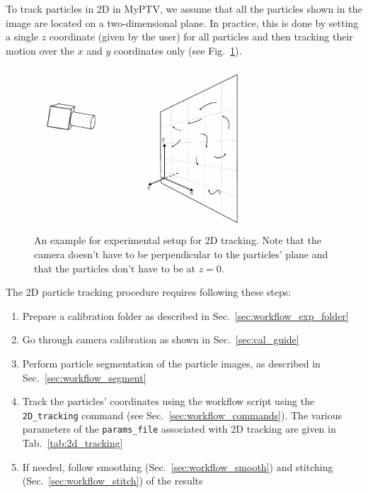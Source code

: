 \documentclass[10pt,a4paper]{article}
\begin{document}
To track particles in 2D in MyPTV, we assume that all the particles shown in the image are located on a two-dimensional plane. In practice, this is done by setting a single $z$ coordinate (given by the user) for all particles and then tracking their motion over the $x$ and $y$ coordinates only (see Fig.~\ref{fig:2D_tracking}).


\begin{figure}
	\centering
	\includegraphics[width=8cm]{2D_tracking_setup.pdf}
	\caption{An example for experimental setup for 2D tracking. Note that the camera doesn't have to be perpendicular to the particles' plane and that the particles don't have to be at $z=0$. \label{fig:2D_tracking}}
\end{figure}


The 2D particle tracking procedure requires following these steps:
%
\begin{enumerate}
	\item Prepare a calibration folder as described in Sec.~\ref{sec:workflow_exp_folder}
	\item Go through camera calibration as shown in Sec.~\ref{sec:cal_guide}
	\item Perform particle segmentation of the particle images, as described in Sec.~\ref{sec:workflow_segment}
	\item Track the particles' coordinates using the workflow script using the \texttt{2D\_tracking} command (see Sec.~\ref{sec:workflow_commands}). The various parameters of the \texttt{params\_file} associated with 2D tracking are given in Tab.~\ref{tab:2d_tracking}
	\item If needed, follow smoothing (Sec.~\ref{sec:workflow_smooth}) and stitching (Sec.~\ref{sec:workflow_stitch}) of the results
\end{enumerate}
%
\end{document}
